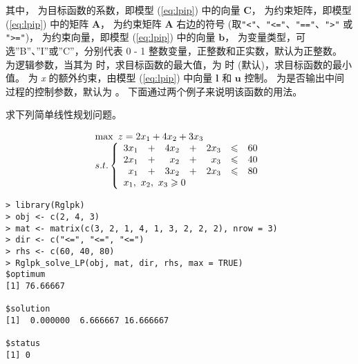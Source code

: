 其中， 为目标函数的系数，即模型 (\ref{eq:lpip}) 中的向量 $\mathbf{C}$，
 为约束矩阵，即模型 (\ref{eq:lpip}) 中的矩阵 $\mathbf{A}$，
 为约束矩阵 $\mathbf{A}$ 右边的符号
 (取\verb|"<"|、\verb|"<="|、\verb|"=="|、\verb|">"| 或 \verb|">="|)，
 为约束向量，即模型 (\ref{eq:lpip}) 中的向量 $\mathbf{b}$，
 为变量类型，可选''B''、''I''或''C''，分别代表 0 - 1 整数变量，正整数和正实数，默认为正整数。
 为逻辑参数，当其为  时，求目标函数的最大值，为  时 (默认)，求目标函数的最小值。
 为 \emph{x} 的额外约束，由模型 (\ref{eq:lpip}) 中向量 $\mathbf{l}$ 和 $\mathbf{u}$ 控制。
 为是否输出中间过程的控制参数，默认为 。
下面通过两个例子来说明该函数的用法。
\begin{exmp}\label{ex:lpip001}
求下列简单线性规划问题。
\end{exmp}
\begin{equation*}
\begin{array}{l}
\max \ z=2 x_1 + 4 x_2 + 3 x_3\\
s.t.\left\{\begin{array}{rrrrrrr}
3x_1 &+ &4 x_2 &+ &2 x_3& \leqslant &60\\
2x_1 &+ &  x_2 &+ &  x_3& \leqslant &40\\
 x_1 &+ &3 x_2 &+ &2 x_3& \leqslant &80\\
\multicolumn{7}{l}{x_1,\  x_2, \ x_3 \geqslant 0}
\end{array}\right.
\end{array}
\end{equation*}

\begin{Verbatim}
> library(Rglpk)
> obj <- c(2, 4, 3)
> mat <- matrix(c(3, 2, 1, 4, 1, 3, 2, 2, 2), nrow = 3)
> dir <- c("<=", "<=", "<=")
> rhs <- c(60, 40, 80)
> Rglpk_solve_LP(obj, mat, dir, rhs, max = TRUE)
$optimum
[1] 76.66667

$solution
[1]  0.000000  6.666667 16.666667

$status
[1] 0
\end{Verbatim}

